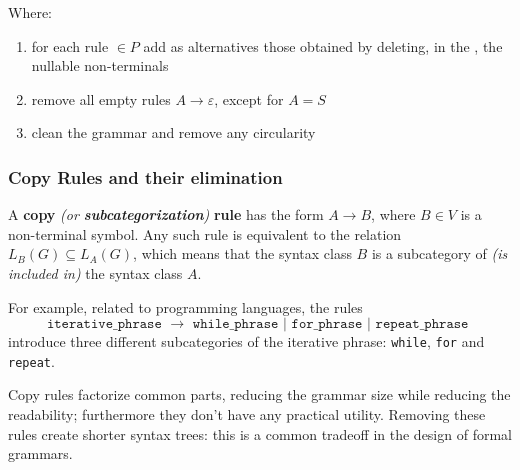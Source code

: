 \documentclass[english]{article}
\begin{document}
Where:

\begin{enumerate}[label=row \arabic*., leftmargin=*, widest=row 1., labelindent=1em]
  \item for each rule \(\in P\) add as alternatives those obtained by deleting, in the \RP, the nullable non-terminals
  \item remove all empty rules \(A \rightarrow \varepsilon\), except for \(A=S\)
  \item clean the grammar and remove any circularity
\end{enumerate}

\subsubsection{Copy Rules and their elimination}
\label{sec:copy-rules-and-their-elimination}

A \textbf{copy}\textit{ (or \textbf{subcategorization})} \textbf{rule} has the form \(A \rightarrow B\), where \(B \in V\) is a non-terminal symbol.
Any such rule is equivalent to the relation \(L_B(G) \subseteq L_A(G)\), which means that the syntax class \(B\) is a subcategory of \textit{(is included in)} the syntax class \(A\).

For example, related to programming languages, the rules
\[\texttt{iterative\_phrase } \rightarrow \texttt{ while\_phrase } | \texttt{ for\_phrase } | \texttt{ repeat\_phrase }\]
introduce three different subcategories of the iterative phrase: \texttt{while}, \texttt{for} and \texttt{repeat}.

Copy rules factorize common parts, reducing the grammar size while reducing the readability;
furthermore they don't have any practical utility.
Removing these rules create shorter syntax trees: this is a common tradeoff in the design of formal grammars.
\end{document}
